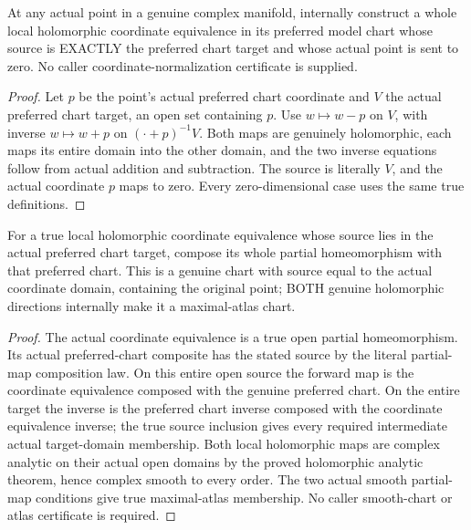 \begin{definition}
\label{hir:submersion-composition-normalized-target}
\leanok
{}
At any actual point in a genuine complex manifold, internally construct
a whole local holomorphic coordinate equivalence in its preferred model
chart whose source is EXACTLY the preferred chart target and whose actual
point is sent to zero. No caller coordinate-normalization certificate is supplied.
\end{definition}
\begin{proof}
Let $p$ be the point's actual preferred chart coordinate and $V$ the actual
preferred chart target, an open set containing $p$. Use $w\mapsto w-p$
on $V$, with inverse $w\mapsto w+p$ on $(\cdot+p)^{-1}V$. Both maps are
genuinely holomorphic, each maps its entire domain into the other domain,
and the two inverse equations follow from actual addition and subtraction.
The source is literally $V$, and the actual coordinate $p$ maps to zero.
Every zero-dimensional case uses the same true definitions.
\end{proof}

\begin{theorem}
\label{hir:submersion-composition-whole-holomorphic-chart}
\leanok
{}
For a true local holomorphic coordinate equivalence whose source lies in
the actual preferred chart target, compose its whole partial homeomorphism
with that preferred chart. This is a genuine chart with source equal to
the actual coordinate domain, containing the original point; BOTH genuine
holomorphic directions internally make it a maximal-atlas chart.
\end{theorem}
\begin{proof}
The actual coordinate equivalence is a true open partial homeomorphism.
Its actual preferred-chart composite has the stated source by the literal
partial-map composition law. On this entire open source the forward map
is the coordinate equivalence composed with the genuine preferred chart.
On the entire target the inverse is the preferred chart inverse composed
with the coordinate equivalence inverse; the true source inclusion gives
every required intermediate actual target-domain membership. Both local
holomorphic maps are complex analytic on their actual open domains by the
proved holomorphic analytic theorem, hence complex smooth to every order.
The two actual smooth partial-map conditions give true maximal-atlas
membership. No caller smooth-chart or atlas certificate is required.
\end{proof}

